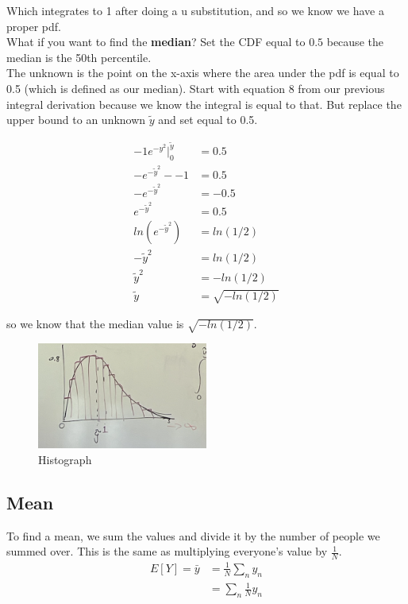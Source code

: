 \documentclass{article}
\begin{document}
Which integrates to 1 after doing a u substitution, and so we know we have a proper pdf. \\

What if you want to find the \textbf{median}? Set the CDF equal to $0.5$ because the median is the 50th percentile. \\

The unknown is the point on the x-axis where the area under the pdf is equal to 0.5 (which is defined as our median). Start with equation 8 from our previous integral derivation because we know the integral is equal to that. But replace the upper bound to an unknown $\tilde{y}$ and set equal to 0.5.

\begin{align}
    -1 e^{-y^2} \bigg |_0^{\tilde {y}} &= 0.5\\
    -e^{- \tilde y ^2} - - 1 &= 0. 5\\
    -e^{- \tilde y ^2} &= - 0.5 \\  
    e^{- \tilde y ^2} & = 0.5\\
    ln( e^{- \tilde y ^2}) &= ln(1/2) \\
    - \tilde y^2 &= ln(1/2)  \\
    \tilde y^2 &= - ln(1/2) \\
    \tilde y &= \sqrt{-ln(1/2)}
\end{align}

so we know that the median value is $\sqrt{- ln(1/2)}$.

\begin{figure}[htp]
    \centering
        \includegraphics[width=0.5\textwidth]{Screen Shot 2023-10-09 at 11.11.30 AM.png}
    \caption{Histograph}
\end{figure}

\subsection{Mean}
To find a mean, we sum the values and divide it by the number of people we summed over. This is the same as multiplying everyone's value by $\frac{1}{N}$. 
\begin{align}
   E[Y]= \bar y &= \frac{1}{N}\sum_n y_n\\
   &= \sum_n \frac{1}{N} y_n
\end{align}
\end{document}
